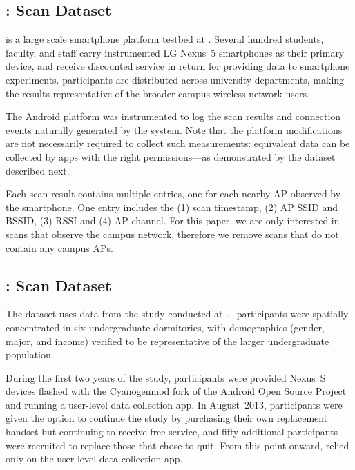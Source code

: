 \subsection{\ubscan{}: \PhoneLab{} \wifi{} Scan Dataset}
\label{sec:phonelab}

\PhoneLab{} is a large scale smartphone platform testbed at \ub{}. Several
hundred students, faculty, and staff carry instrumented LG Nexus~5 smartphones
as their primary device, and receive discounted service in return for providing
data to smartphone experiments. \PhoneLab{} participants are distributed across
university departments, making the results representative of the broader campus
wireless network users.

The \PhoneLab{} Android platform was instrumented to log the \wifi{} scan
results and \wifi{} connection events naturally generated by the system.
Note that the platform modifications are not necessarily required to collect such
measurements: equivalent data can be collected by apps with the right
permissions---as demonstrated by the \ndscan{} dataset described next.

Each scan result contains multiple entries, one for each nearby
\wifi{} AP observed by the smartphone. One entry includes the
(1) scan timestamp, (2) AP SSID and BSSID, (3) RSSI and (4) AP channel. For
this paper, we are only interested in scans that observe the \ub{} campus
network, therefore we remove scans that do not contain any \ub{} campus APs.


\subsection{\ndscan{}: \NetSense{} \wifi{} Scan Dataset}
\label{sec:netsense}

The \ndscan{} dataset uses data from the \NetSense{} study
conducted at \nd{}.
\NetSense{}~participants were spatially concentrated in six undergraduate
dormitories, with demographics (gender, major, and income) verified
to be representative of the larger undergraduate population.

During the first two years of the study, \NetSense{} participants were
provided Nexus~S devices flashed with the Cyanogenmod fork of the Android Open
Source Project and
running a user-level data collection app. In August~2013, participants were
given the option to continue the study by purchasing their own replacement
handset but continuing to receive free service, and fifty additional
participants were recruited to replace those that chose to quit. From this
point onward, \NetSense{} relied only on the user-level data collection app.

